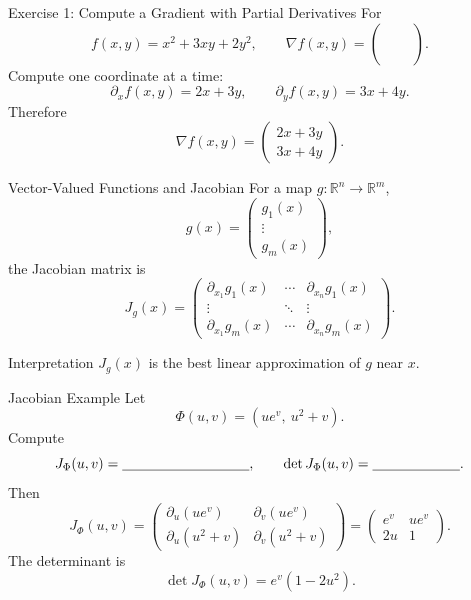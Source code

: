 \documentclass[aspectratio=169]{beamer}
\newcommand{\R}{\mathbb{R}}
\begin{document}
\begin{frame}{Exercise 1: Compute a Gradient with Partial Derivatives}
For
\[
f(x,y)=x^2+3xy+2y^2,
\qquad
\nabla f(x,y)=\begin{pmatrix}\phantom{\partial_x f}\\[2mm]\phantom{\partial_y f}\end{pmatrix}.
\]
\pause
Compute one coordinate at a time:
\[
\partial_x f(x,y)=2x+3y,
\qquad
\partial_y f(x,y)=3x+4y.
\]
Therefore
\[
\boxed{\nabla f(x,y)=\begin{pmatrix}2x+3y\\3x+4y\end{pmatrix}.}
\]
\end{frame}

\begin{frame}{Vector-Valued Functions and Jacobian}
For a map $g:\R^n\to\R^m$,
\[
g(x)=
\begin{pmatrix}
g_1(x)\\
\vdots\\
g_m(x)
\end{pmatrix},
\]
the Jacobian matrix is
\[
J_g(x)=
\begin{pmatrix}
\partial_{x_1}g_1(x)&\cdots&\partial_{x_n}g_1(x)\\
\vdots&\ddots&\vdots\\
\partial_{x_1}g_m(x)&\cdots&\partial_{x_n}g_m(x)
\end{pmatrix}.
\]
\pause
\begin{block}{Interpretation}
$J_g(x)$ is the best linear approximation of $g$ near $x$.
\end{block}
\end{frame}

\begin{frame}{Jacobian Example}
Let
\[
\Phi(u,v)=(ue^v,\ u^2+v).
\]
Compute
\[
J_\Phi(u,v)=\underline{\hspace{3.2cm}},
\qquad
\det J_\Phi(u,v)=\underline{\hspace{2.2cm}}.
\]
\pause
Then
\[
J_\Phi(u,v)=
\begin{pmatrix}
\partial_u(ue^v)&\partial_v(ue^v)\\
\partial_u(u^2+v)&\partial_v(u^2+v)
\end{pmatrix}
=
\begin{pmatrix}
e^v&ue^v\\
2u&1
\end{pmatrix}.
\]
\pause
The determinant is
\[
\det J_\Phi(u,v)=e^v(1-2u^2).
\]
\end{frame}
\end{document}
